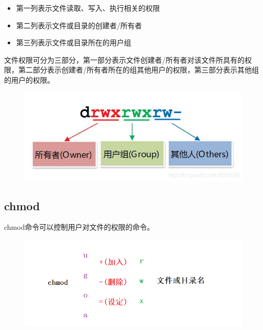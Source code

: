 \documentclass[12pt, openany, oneside]{book}
\begin{document}
\begin{itemize}
    \item 第一列表示文件读取、写入、执行相关的权限

    \item 第二列表示文件或目录的创建者/所有者

    \item 第三列表示文件或目录所在的用户组
\end{itemize}

文件权限可分为三部分，第一部分表示文件创建者/所有者对该文件所具有的权限，第二部分表示创建者/所有者所在的组其他用户的权限，第三部分表示其他组的用户的权限。

\begin{table}[H]
    \centering
    \caption{文件权限}
\end{table}

\begin{figure}[H]
    \centering
    \includegraphics[scale=0.7]{img/Chapter5/5-2/2.png}
\end{figure}

\subsection{chmod}

chmod命令可以控制用户对文件的权限的命令。

\begin{figure}[H]
    \centering
    \includegraphics[scale=0.6]{img/Chapter5/5-2/3.png}
\end{figure}
\end{document}
